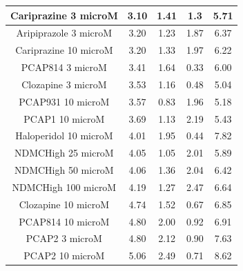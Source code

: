 \documentclass[a4paper,12pt]{article}
\begin{document}
\begin{table}[h!]
\begin{tabular}{|c|c|c|c|c|}
Cariprazine 3 microM   & 3.10  & 1.41 & 1.3  & 5.71 \\ \hline
Aripiprazole 3 microM  & 3.20  & 1.23 & 1.87 & 6.37 \\ \hline
Cariprazine 10 microM  & 3.20  & 1.33 & 1.97 & 6.22 \\ \hline
PCAP814 3 microM       & 3.41 & 1.64 & 0.33 & 6.00    \\ \hline
Clozapine 3 microM     & 3.53 & 1.16 & 0.48 & 5.04 \\ \hline
PCAP931 10 microM      & 3.57 & 0.83 & 1.96 & 5.18 \\ \hline
PCAP1 10 microM        & 3.69 & 1.13 & 2.19 & 5.43 \\ \hline
Haloperidol 10 microM  & 4.01 & 1.95 & 0.44 & 7.82 \\ \hline
NDMCHigh 25 microM     & 4.05 & 1.05 & 2.01 & 5.89 \\ \hline
NDMCHigh 50 microM     & 4.06 & 1.36 & 2.04 & 6.42 \\ \hline
NDMCHigh 100 microM    & 4.19 & 1.27 & 2.47 & 6.64 \\ \hline
Clozapine 10 microM    & 4.74 & 1.52 & 0.67 & 6.85 \\ \hline
PCAP814 10 microM      & 4.80  & 2.00    & 0.92 & 6.91 \\ \hline
PCAP2 3 microM         & 4.80  & 2.12 & 0.90  & 7.63 \\ \hline
PCAP2 10 microM        & 5.06 & 2.49 & 0.71 & 8.62 \\ \hline
\end{tabular}
\end{table}
\newpage
\end{document}
